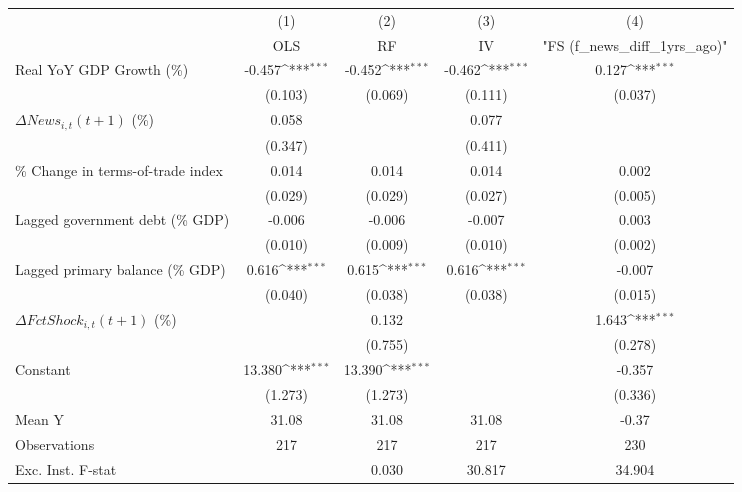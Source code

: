 {
\def\sym#1{\ifmmode^{#1}\else\(^{#1}\)\fi}
\begin{tabular}{l*{4}{c}}
\toprule
                    &\multicolumn{1}{c}{(1)}&\multicolumn{1}{c}{(2)}&\multicolumn{1}{c}{(3)}&\multicolumn{1}{c}{(4)}\\
                    &\multicolumn{1}{c}{OLS}&\multicolumn{1}{c}{RF}&\multicolumn{1}{c}{IV}&\multicolumn{1}{c}{ "FS (f_news_diff_1yrs_ago)" }\\
\midrule
Real YoY GDP Growth (\%)&      -0.457\sym{***}&      -0.452\sym{***}&      -0.462\sym{***}&       0.127\sym{***}\\
                    &     (0.103)         &     (0.069)         &     (0.111)         &     (0.037)         \\
\addlinespace
$ \Delta News_{i,t}(t+1)$ (\%)&       0.058         &                     &       0.077         &                     \\
                    &     (0.347)         &                     &     (0.411)         &                     \\
\addlinespace
\% Change in terms-of-trade index&       0.014         &       0.014         &       0.014         &       0.002         \\
                    &     (0.029)         &     (0.029)         &     (0.027)         &     (0.005)         \\
\addlinespace
Lagged government debt (\% GDP)&      -0.006         &      -0.006         &      -0.007         &       0.003         \\
                    &     (0.010)         &     (0.009)         &     (0.010)         &     (0.002)         \\
\addlinespace
Lagged primary balance (\% GDP)&       0.616\sym{***}&       0.615\sym{***}&       0.616\sym{***}&      -0.007         \\
                    &     (0.040)         &     (0.038)         &     (0.038)         &     (0.015)         \\
\addlinespace
$ \Delta FctShock_{i,t}(t+1)$ (\%)&                     &       0.132         &                     &       1.643\sym{***}\\
                    &                     &     (0.755)         &                     &     (0.278)         \\
\addlinespace
Constant            &      13.380\sym{***}&      13.390\sym{***}&                     &      -0.357         \\
                    &     (1.273)         &     (1.273)         &                     &     (0.336)         \\
\midrule
Mean Y              &       31.08         &       31.08         &       31.08         &       -0.37         \\
Observations        &         217         &         217         &         217         &         230         \\
Exc. Inst. F-stat   &                     &       0.030         &      30.817         &      34.904         \\
\bottomrule
\end{tabular}
}
